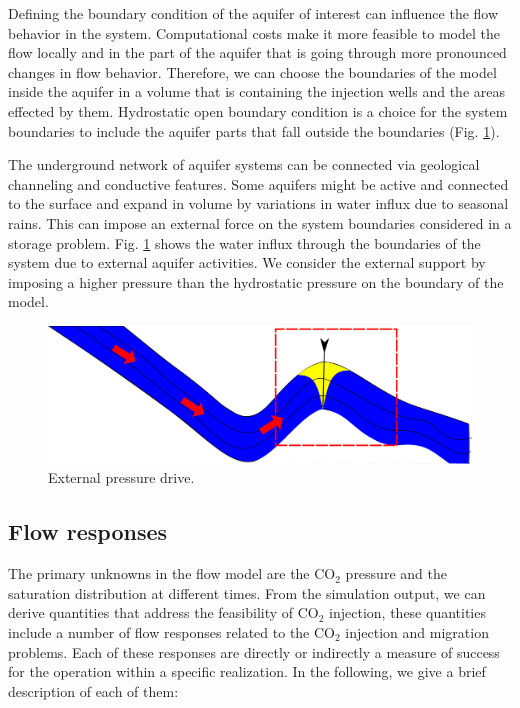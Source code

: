 Defining the boundary condition of the aquifer of interest can influence the
flow behavior in the system. Computational costs make it more feasible to model the flow locally and in the
part of the aquifer that is going through more pronounced changes in flow
behavior. Therefore, we can choose the boundaries of the model inside the aquifer
in a volume that is containing the injection wells and the areas effected by
them. Hydrostatic open boundary condition is a choice for the system boundaries
to include the aquifer parts that fall outside the boundaries (Fig.
\ref{fig:bkw}).

The underground network of aquifer systems can be connected via geological
channeling and conductive features. Some aquifers might be active and connected
to the surface and expand in volume by variations in water influx due to 
seasonal rains. This can impose an external force on the system boundaries
considered in a storage problem. Fig. \ref{fig:bkw} shows the water influx
through the boundaries of the system due to external aquifer activities. We
consider the external support by imposing a higher pressure than the hydrostatic
pressure on the boundary of the model.

\begin{figure}[thb]
  \centering
  \includegraphics[width=0.65 \linewidth]{./figurer/bkw} 
  \caption{External pressure drive.}
  \label{fig:bkw}
%
\end{figure}


\subsection{Flow responses}

The primary unknowns in the flow model are the $\mbox{CO}_2$ pressure
and the saturation distribution at different times. From the simulation
output, we can derive quantities that
address the feasibility of $\mbox{CO}_2$ injection,
these quantities include a number of flow responses related to the $\mbox{CO}_2$
injection and migration problems. Each of these responses are directly or
indirectly a measure of success for the operation within a specific realization.
In the following, we give a brief description of each of them:

